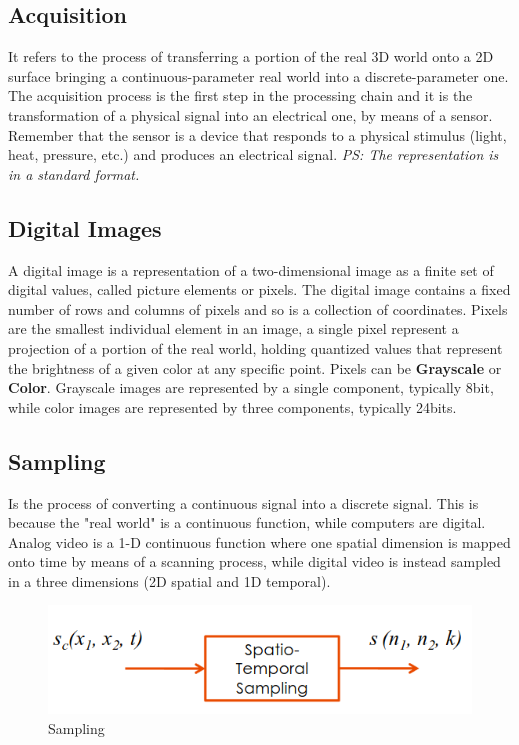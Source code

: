 \subsection{Acquisition}
It refers to the process of transferring a portion of the real 3D world onto a 2D surface bringing a continuous-parameter real world into a discrete-parameter one. 
The acquisition process is the first step in the processing chain and it is the transformation of a physical signal into an electrical one, by means of a sensor. 
Remember that the sensor is a device that responds to a physical stimulus (light, heat, pressure, etc.) and produces an electrical signal. 
\textit{PS: The representation is in a standard format.}
\\
\subsection{Digital Images}
A digital image is a representation of a two-dimensional image as a finite set of digital values, called picture elements or pixels. 
The digital image contains a fixed number of rows and columns of pixels and so is a collection of coordinates. Pixels are the smallest individual element in an image, a single pixel represent a projection of a portion of the real world, holding quantized values that represent the brightness of a given color at any specific point. Pixels can be \textbf{Grayscale} or \textbf{Color}. 
Grayscale images are represented by a single component, typically 8bit, while color images are represented by three components, typically 24bits.
\\
\subsection{Sampling}
Is the process of converting a continuous signal into a discrete signal. This is because the "real world" is a continuous function, while computers are digital. Analog video is a 1-D continuous function where one spatial dimension is mapped onto time by means of a scanning process, while digital video is instead sampled in a three dimensions (2D spatial and 1D temporal).
\\
\begin{figure}[h]
    \centering
    \includegraphics[scale=0.5]{Figures/Sampling.png}
    \caption{Sampling}
    \label{fig:enter-label}
\end{figure}

